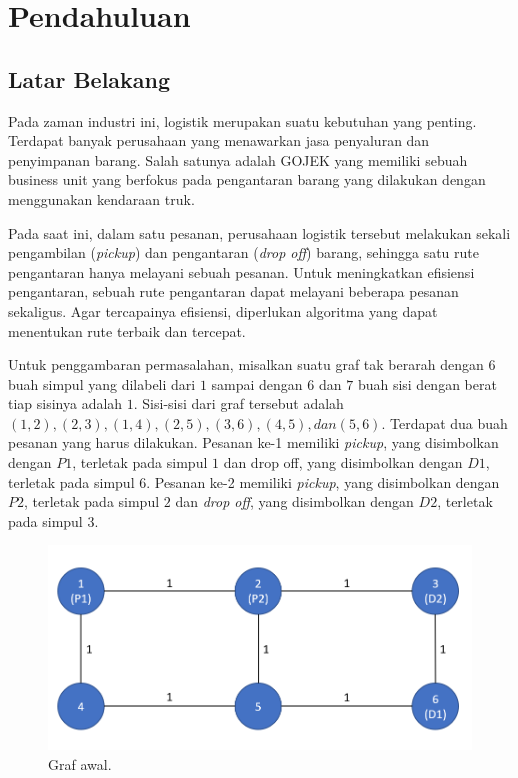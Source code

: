 \chapter{Pendahuluan}

\section{Latar Belakang}

Pada zaman industri ini, logistik merupakan suatu kebutuhan yang penting. Terdapat banyak perusahaan yang menawarkan jasa penyaluran dan penyimpanan barang.
Salah satunya adalah GOJEK yang memiliki sebuah business unit yang berfokus pada pengantaran barang yang dilakukan dengan menggunakan kendaraan truk.

Pada saat ini, dalam satu pesanan, perusahaan logistik tersebut melakukan sekali pengambilan (\textit{pickup}) dan pengantaran (\textit{drop off}) barang,
sehingga satu rute pengantaran hanya melayani sebuah pesanan. Untuk meningkatkan efisiensi pengantaran, sebuah rute pengantaran dapat melayani beberapa pesanan sekaligus.
Agar tercapainya efisiensi, diperlukan algoritma yang dapat menentukan rute terbaik dan tercepat.

Untuk penggambaran permasalahan, misalkan suatu graf tak berarah dengan $6$ buah simpul yang dilabeli dari $1$ sampai dengan $6$ dan $7$ buah sisi dengan berat tiap sisinya adalah $1$.
Sisi-sisi dari graf tersebut adalah $(1,2), (2,3), (1,4), (2,5), (3,6), (4,5), dan (5,6)$. Terdapat dua buah pesanan yang harus dilakukan. Pesanan ke-1 memiliki \textit{pickup},
yang disimbolkan dengan $P1$, terletak pada simpul $1$ dan drop off, yang disimbolkan dengan $D1$, terletak pada simpul $6$. Pesanan ke-2 memiliki \textit{pickup}, yang
disimbolkan dengan $P2$, terletak pada simpul $2$ dan \textit{drop off}, yang disimbolkan dengan $D2$, terletak pada simpul $3$.

\begin{figure}[h]
    \centering
    \includegraphics[width=1.0\textwidth]{resources/graph_init.png}
    \caption{Graf awal.}
\end{figure}

